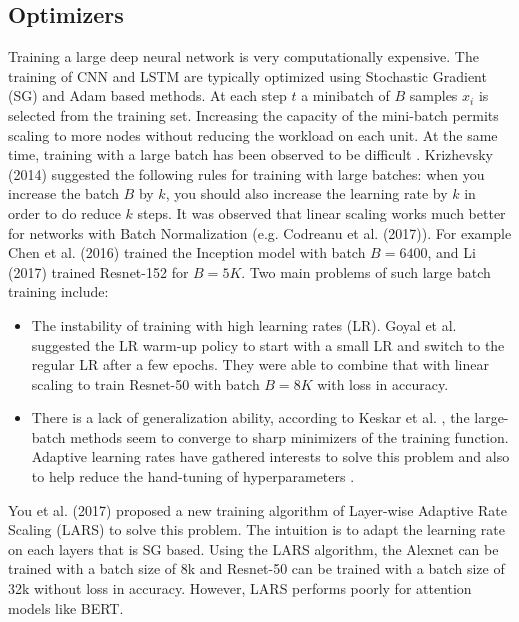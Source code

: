 \subsection{Optimizers}


Training a large deep neural network is very computationally expensive. The training of CNN and LSTM are typically optimized using Stochastic Gradient (SG) and Adam based methods.  At each step $t$ a minibatch of $B$ samples $x_i$
is selected from the training set. Increasing the capacity of the mini-batch permits scaling to more nodes without reducing
the workload on each unit. At the same time, training with a large batch has been observed to be difficult \cite{Krizhevsky}. Krizhevsky (2014) suggested the following rules for training with large batches: when you increase
the batch $B$ by $k$, you should also increase the learning rate by $k$ in order to do reduce $k$ steps.  It was observed that linear scaling works much better for networks with Batch
Normalization (e.g. Codreanu et al. (2017)). For example Chen et al. (2016) trained the Inception
model with batch $B=6400$, and Li (2017) trained Resnet-152 for $B=5K$. Two main problems of such large batch training include: 

\begin{itemize}
    \item The instability of training with high learning rates (LR). Goyal et al. suggested the LR warm-up policy to start with a small LR and switch to the regular LR after a few epochs. They were able to combine that with linear scaling to train Resnet-50 with batch $B=8K$ with loss in accuracy. 
    
    \item There is a lack of generalization ability, according to Keskar et al. \cite{Keskar}, the large-batch methods seem to converge to sharp minimizers of the training function. Adaptive learning rates have gathered interests to solve this problem and also to help reduce the hand-tuning of hyperparameters \cite{adaplr}.  
\end{itemize}




You et al. (2017) \cite{ginsburg2018large} proposed a new training algorithm of Layer-wise Adaptive
Rate Scaling (LARS) to solve this problem. The intuition is to adapt the learning rate on each layers that is SG based. Using the LARS algorithm, the Alexnet can be trained with a batch size of 8k and Resnet-50 can be trained with a batch size of 32k without loss in accuracy. However, LARS performs poorly for attention models like BERT. 


